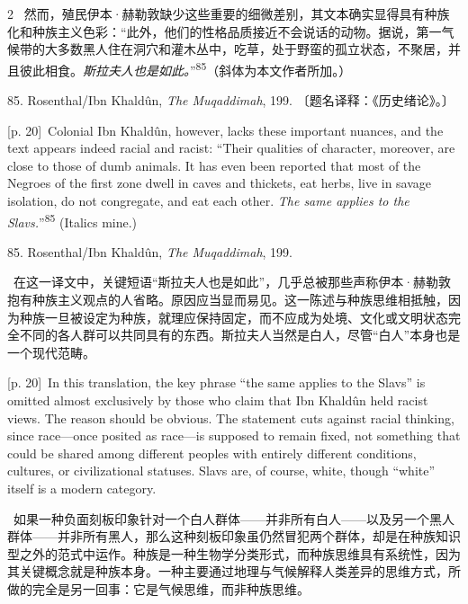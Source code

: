\documentclass[10pt,a4paper]{article}
\begin{document}
\begin{paracol}{2}
\switchcolumn*
{\scriptsize\color{gray} [p. 20]}\ 然而，殖民伊本·赫勒敦缺少这些重要的细微差别，其文本确实显得具有种族化和种族主义色彩：“此外，他们的性格品质接近不会说话的动物。据说，第一气候带的大多数黑人住在洞穴和灌木丛中，吃草，处于野蛮的孤立状态，不聚居，并且彼此相食。\textit{斯拉夫人也是如此。}”\nobreak\textsuperscript{85}（斜体为本文作者所加。）\par{\small 85. Rosenthal/Ibn Khaldûn, \textit{The Muqaddimah}, 199. 〔题名译释：《历史绪论》。〕\par}
\switchcolumn
{\scriptsize\color{gray} [p. 20]}\ Colonial Ibn Khaldûn, however, lacks these important nuances, and the text appears indeed racial and racist: “Their qualities of character, moreover, are close to those of dumb animals. It has even been reported that most of the Negroes of the first zone dwell in caves and thickets, eat herbs, live in savage isolation, do not congregate, and eat each other. \textit{The same applies to the Slavs.}”\nobreak\textsuperscript{85} (Italics mine.)\par{\small 85. Rosenthal/Ibn Khaldûn, \textit{The Muqaddimah}, 199.\par}
\switchcolumn*
{\scriptsize\color{gray} [p. 20]}\ 在这一译文中，关键短语“斯拉夫人也是如此”，几乎总被那些声称伊本·赫勒敦抱有种族主义观点的人省略。原因应当显而易见。这一陈述与种族思维相抵触，因为种族一旦被设定为种族，就理应保持固定，而不应成为处境、文化或文明状态完全不同的各人群可以共同具有的东西。斯拉夫人当然是白人，尽管“白人”本身也是一个现代范畴。\par
\switchcolumn
{\scriptsize\color{gray} [p. 20]}\ In this translation, the key phrase “the same applies to the Slavs” is omitted almost exclusively by those who claim that Ibn Khaldûn held racist views. The reason should be obvious. The statement cuts against racial thinking, since race—once posited as race—is supposed to remain fixed, not something that could be shared among different peoples with entirely different conditions, cultures, or civilizational statuses. Slavs are, of course, white, though “white” itself is a modern category.\par
\switchcolumn*
{\scriptsize\color{gray} [p. 20]}\ 如果一种负面刻板印象针对一个白人群体——并非所有白人——以及另一个黑人群体——并非所有黑人，那么这种刻板印象虽仍然冒犯两个群体，却是在种族知识型之外的范式中运作。种族是一种生物学分类形式，而种族思维具有系统性，因为其关键概念就是种族本身。一种主要通过地理与气候解释人类差异的思维方式，所做的完全是另一回事：它是气候思维，而非种族思维。\par
\switchcolumn

\end{paracol}
\end{document}

